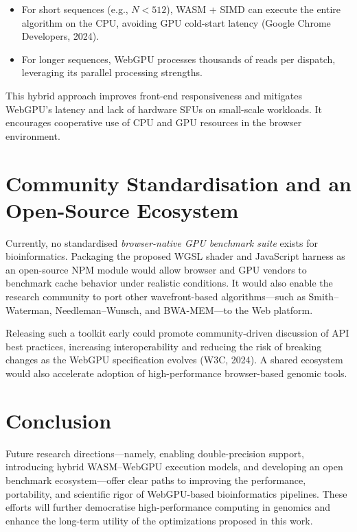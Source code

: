 \documentclass[PhD]{PHlab-thesis}
\begin{document}
\begin{itemize}
    \item For short sequences (e.g., $N < 512$), WASM + SIMD can execute the entire algorithm on the CPU, avoiding GPU cold-start latency (Google Chrome Developers, 2024).
    \item For longer sequences, WebGPU processes thousands of reads per dispatch, leveraging its parallel processing strengths.
\end{itemize}

This hybrid approach improves front-end responsiveness and mitigates WebGPU's latency and lack of hardware SFUs on small-scale workloads. It encourages cooperative use of CPU and GPU resources in the browser environment.

\section{Community Standardisation and an Open-Source Ecosystem}

Currently, no standardised \emph{browser-native GPU benchmark suite} exists for bioinformatics. Packaging the proposed WGSL shader and JavaScript harness as an open-source NPM module would allow browser and GPU vendors to benchmark cache behavior under realistic conditions. It would also enable the research community to port other wavefront-based algorithms—such as Smith–Waterman, Needleman–Wunsch, and BWA-MEM—to the Web platform.

Releasing such a toolkit early could promote community-driven discussion of API best practices, increasing interoperability and reducing the risk of breaking changes as the WebGPU specification evolves (W3C, 2024). A shared ecosystem would also accelerate adoption of high-performance browser-based genomic tools.

\section*{Conclusion}

Future research directions—namely, enabling double-precision support, introducing hybrid WASM–WebGPU execution models, and developing an open benchmark ecosystem—offer clear paths to improving the performance, portability, and scientific rigor of WebGPU-based bioinformatics pipelines. These efforts will further democratise high-performance computing in genomics and enhance the long-term utility of the optimizations proposed in this work.
\end{document}

